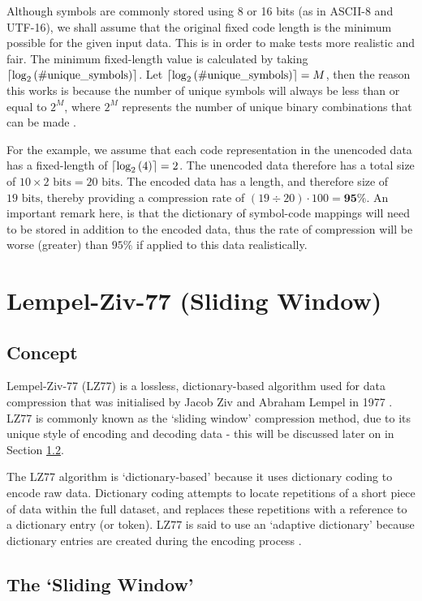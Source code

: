 \documentclass[12pt]{article}
\DeclarePairedDelimiter{\ceil}{\lceil}{\rceil}
\begin{document}
Although symbols are commonly stored using 8 or 16 bits (as in ASCII-8 and UTF-16), we shall assume that the original fixed code length is the minimum possible for the given input data. This is in order to make tests more realistic and fair. The minimum fixed-length value is calculated by taking $\ceil{\log_2{\text{(\#unique\_symbols)}}}$. Let $\ceil{\log_2{\text{(\#unique\_symbols)}}}=M$, then the reason this works is because the number of unique symbols will always be less than or equal to $2^M$, where $2^M$ represents the number of unique binary combinations that can be made \citep{code_definitions}.

For the example, we assume that each code representation in the unencoded data has a fixed-length of $\ceil{\log_2{(4)}}=2$. The unencoded data therefore has a total size of $10\times2 \text{ bits} = 20\text{ bits}$. The encoded data has a length, and therefore size of $19\text{ bits}$, thereby providing a compression rate of $(19\div20)\cdot100 = \textbf{95\%}$. An important remark here, is that the dictionary of symbol-code mappings will need to be stored in addition to the encoded data, thus the rate of compression will be worse (greater) than $95\%$ if applied to this data realistically.

\clearpage
\section{Lempel-Ziv-77 (Sliding Window)}
\subsection{Concept}	
Lempel-Ziv-77 (LZ77) is a lossless, dictionary-based algorithm used for data compression that was initialised by Jacob Ziv and Abraham Lempel in 1977 \citep{lz77}. LZ77 is commonly known as the `sliding window' compression method, due to its unique style of encoding and decoding data - this will be discussed later on in Section \ref{sec_sliding_window}.

The LZ77 algorithm is `dictionary-based' because it uses dictionary coding to encode raw data. Dictionary coding attempts to locate repetitions of a short piece of data within the full dataset, and replaces these repetitions with a reference to a dictionary entry (or token). LZ77 is said to use an `adaptive dictionary' because dictionary entries are created during the encoding process \citep{the_lz_algorithm}. 

\subsection{The `Sliding Window'} \label{sec_sliding_window}
\end{document}
